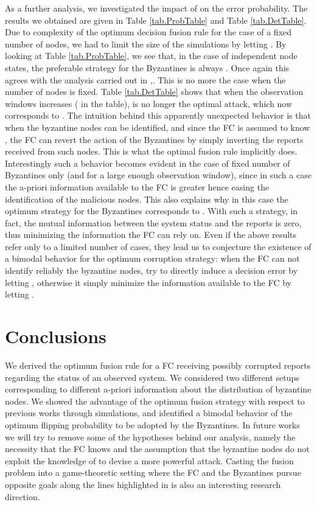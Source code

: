 \documentclass[10pt,peerreview,draftcls,onecolumn]{IEEEtran}
\begin{document}
As a further analysis, we investigated the impact of  on the error probability. The results we obtained are given in Table \ref{tab.ProbTable} and Table \ref{tab.DetTable}. Due to complexity of the optimum decision fusion rule for the case of a fixed number of nodes, we had to limit the size of the simulations by letting .
By looking at Table \ref{tab.ProbTable}, we see that, in the case of independent node states, the preferable strategy for the Byzantines is always . Once again this agrees with  the analysis carried out in \cite{CDC},\cite{KBKV13}.
This is no more the case when the number of nodes is fixed. Table \ref{tab.DetTable} shows that when the observation windows  increases ( in the table),  is no longer the optimal attack, which now corresponds to . The intuition behind this apparently unexpected behavior is that when the byzantine nodes can be identified, and since the FC is assumed to know , the FC can revert the action of the Byzantines by simply inverting the reports received from such nodes. This is what the optimal fusion rule implicitly does. Interestingly such a behavior becomes evident in the case of fixed number of Byzantines only (and for a large enough observation window), since in such a case the a-priori information available to the FC is greater hence easing the identification of the malicious nodes. This also explains why in this case the optimum strategy for the Byzantines corresponds to . With such a strategy, in fact, the mutual information between the system status and the reports is zero, thus minimizing the information the FC can rely on. Even if the above results refer only to a limited number of cases, they lead us to conjecture the existence of a bimodal behavior for the optimum corruption strategy: when the FC can not identify reliably the byzantine nodes, try to directly induce a decision error by letting , otherwise it simply minimize the information available to the FC by letting .


\section{Conclusions}
\label{sec.conc}

We derived the optimum fusion rule for a FC receiving possibly corrupted reports regarding the status of an observed system. We considered two different setups corresponding to different a-priori information about the distribution of byzantine nodes. We showed the advantage of the optimum fusion strategy with respect to previous works through simulations, and identified a bimodal behavior of the optimum flipping probability to be adopted by the Byzantines. In future works we will try to remove some of the hypotheses behind our analysis, namely the necessity that the FC knows  and the assumption that the byzantine nodes do not exploit the knowledge of  to devise a more powerful attack. Casting the fusion problem into a game-theoretic setting where the FC and the Byzantines pursue opposite goals along the lines highlighted in \cite{BarGon13} is also an interesting research direction.


\end{document}
